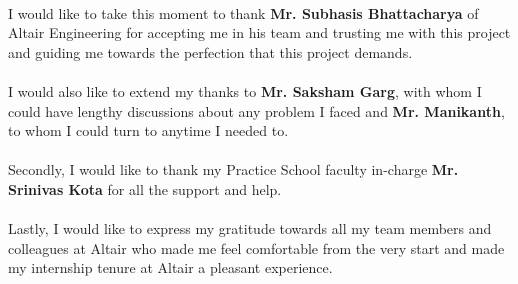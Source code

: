 

\paragraph{}
I would like to take this moment to thank \textbf{Mr. Subhasis Bhattacharya} of Altair Engineering for accepting me in his team and trusting me with this project and guiding me towards the perfection that this project demands.

\paragraph{}
I would also like to extend my thanks to \textbf{Mr. Saksham Garg}, with whom I could have lengthy discussions about any problem I faced and \textbf{Mr. Manikanth}, to whom I could turn to anytime I needed to.

\paragraph{}
Secondly, I would like to thank my Practice School faculty in-charge \textbf{Mr. Srinivas Kota} for all the support and help.

\paragraph{}
Lastly, I would like to express my gratitude towards all my team members and colleagues at Altair who made me feel comfortable from the very start and made my internship tenure at Altair a pleasant experience.
